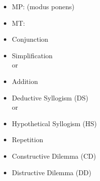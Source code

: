  \begin{itemize}
     \item MP: (modus ponens)\\
     \item MT:\\
     \item Conjunction\\
     \item Simplification\\
      or 
     \item Addition\\
     \item Deductive Syllogism (DS)\\
      or 
     \item Hypothetical Syllogism (HS)\\
     \item Repetition\\
     \item Constructive Dilemma (CD)\\
     \item Distructive Dilemma (DD)\\
 \end{itemize}

